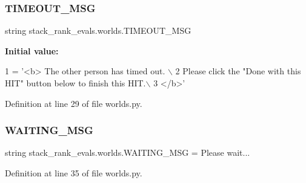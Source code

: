 \subsubsection{\texorpdfstring{T\+I\+M\+E\+O\+U\+T\+\_\+\+M\+SG}{TIMEOUT\_MSG}}
{\footnotesize\ttfamily string stack\+\_\+rank\+\_\+evals.\+worlds.\+T\+I\+M\+E\+O\+U\+T\+\_\+\+M\+SG}

{\bfseries Initial value\+:}
\begin{DoxyCode}
1 =  \textcolor{stringliteral}{'<b> The other person has timed out. \(\backslash\)}
2 \textcolor{stringliteral}{        Please click the "Done with this HIT" button below to finish this HIT.\(\backslash\)}
3 \textcolor{stringliteral}{        </b>'}
\end{DoxyCode}


Definition at line 29 of file worlds.\+py.

\mbox{\label{namespacestack__rank__evals_1_1worlds_a483bf761928ce74cf15f134bc15a355d}} 
\subsubsection{\texorpdfstring{W\+A\+I\+T\+I\+N\+G\+\_\+\+M\+SG}{WAITING\_MSG}}
{\footnotesize\ttfamily string stack\+\_\+rank\+\_\+evals.\+worlds.\+W\+A\+I\+T\+I\+N\+G\+\_\+\+M\+SG = \textquotesingle{}Please wait...\textquotesingle{}}



Definition at line 35 of file worlds.\+py.

